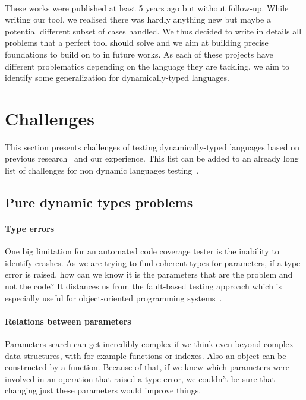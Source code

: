 \documentclass{llncs2e/llncs}
\begin{document}
\paragraph{} These works were published at least 5 years ago but without
follow-up. While writing our tool, we realised there was hardly anything new but
maybe a potential different subset of cases handled. We thus decided to write in
details all problems that a perfect tool should solve and we aim at building
precise foundations to build on to in future works. As each of these projects
have different problematics depending on the language they are tackling, we aim
to identify some generalization for dynamically-typed languages.%


\section{Challenges}
\label{challenges}

This section presents challenges of testing dynamically-typed languages based on
previous research~\cite{ducasse2011challenges} and our experience. This list
can be added to an already long list of challenges for non dynamic languages
testing~\cite{mcminn2011search}.

\subsection{Pure dynamic types problems}
\paragraph{Type errors} One big limitation for an automated code coverage tester
is the inability to identify crashes. As we are trying to find coherent types
for parameters, if a type error is raised, how can we know it is the parameters
that are the problem and not the code? It distances us from the fault-based
testing approach which is especially useful for object-oriented programming
systems~\cite{hayes1994testing}.

\paragraph{Relations between parameters} Parameters search can get incredibly
complex if we think even beyond complex data structures, with for example
functions or indexes. Also an object can be constructed by a function. Because
of that, if we knew which parameters were involved in an operation that raised a
type error, we couldn't be sure that changing just these parameters would
improve things.
\end{document}
